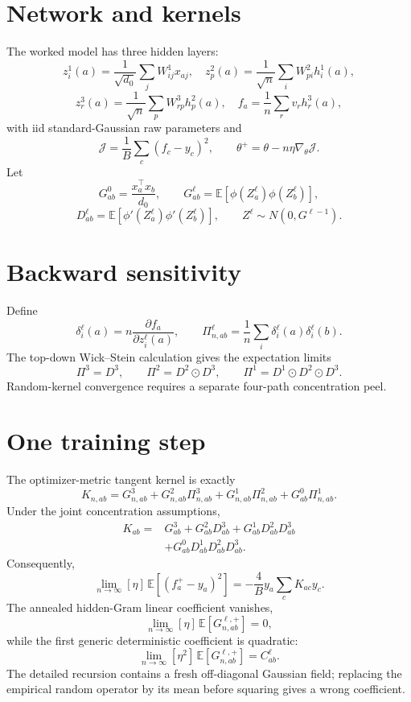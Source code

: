 \documentclass[9pt,oneside]{extreport}
\newcommand{\odotprod}{\mathbin{\odot}}
\begin{document}
\section{Network and kernels}

The worked model has three hidden layers:
\[
z_i^1(a)=\frac1{\sqrt{d_0}}\sum_jW^1_{ij}x_{aj},\quad
z_p^2(a)=\frac1{\sqrt n}\sum_iW^2_{pi}h_i^1(a),
\]
\[
z_r^3(a)=\frac1{\sqrt n}\sum_pW^3_{rp}h_p^2(a),\quad
f_a=\frac1n\sum_rv_rh_r^3(a),
\]
with iid standard-Gaussian raw parameters and
\[
\mathcal J=\frac1B\sum_c(f_c-y_c)^2,\qquad
\theta^+=\theta-n\eta\nabla_\theta\mathcal J.
\]
Let
\[
G^0_{ab}=\frac{x_a^\top x_b}{d_0},\qquad
G^\ell_{ab}=\mathbb E[\phi(Z^\ell_a)\phi(Z^\ell_b)],
\]
\[
D^\ell_{ab}=\mathbb E[\phi'(Z^\ell_a)\phi'(Z^\ell_b)],
\qquad Z^\ell\sim N(0,G^{\ell-1}).
\]

\section{Backward sensitivity}

Define
\[
\delta_i^\ell(a)=n\frac{\partial f_a}{\partial z_i^\ell(a)},\qquad
\Pi^\ell_{n,ab}=\frac1n\sum_i\delta_i^\ell(a)\delta_i^\ell(b).
\]
The top-down Wick--Stein calculation gives the expectation limits
\[
\Pi^3=D^3,\qquad
\Pi^2=D^2\odotprod D^3,\qquad
\Pi^1=D^1\odotprod D^2\odotprod D^3.
\]
Random-kernel convergence requires a separate four-path concentration peel.

\section{One training step}

The optimizer-metric tangent kernel is exactly
\[
K_{n,ab}
=G^3_{n,ab}
+G^2_{n,ab}\Pi^3_{n,ab}
+G^1_{n,ab}\Pi^2_{n,ab}
+G^0_{ab}\Pi^1_{n,ab}.
\]
Under the joint concentration assumptions,
\[
\begin{aligned}
K_{ab}
={}&G^3_{ab}+G^2_{ab}D^3_{ab}
+G^1_{ab}D^2_{ab}D^3_{ab}\\
&+G^0_{ab}D^1_{ab}D^2_{ab}D^3_{ab}.
\end{aligned}
\]
Consequently,
\[
\lim_{n\to\infty}[\eta]\,
\mathbb E[(f_a^+-y_a)^2]
=-\frac4B y_a\sum_cK_{ac}y_c.
\]
The annealed hidden-Gram linear coefficient vanishes,
\[
\lim_{n\to\infty}[\eta]\,
\mathbb E[G_{n,ab}^{\ell,+}]=0,
\]
while the first generic deterministic coefficient is quadratic:
\[
\lim_{n\to\infty}[\eta^2]\,
\mathbb E[G_{n,ab}^{\ell,+}]=C^\ell_{ab}.
\]
The detailed recursion contains a fresh off-diagonal Gaussian field; replacing
the empirical random operator by its mean before squaring gives a wrong
coefficient.
\end{document}

